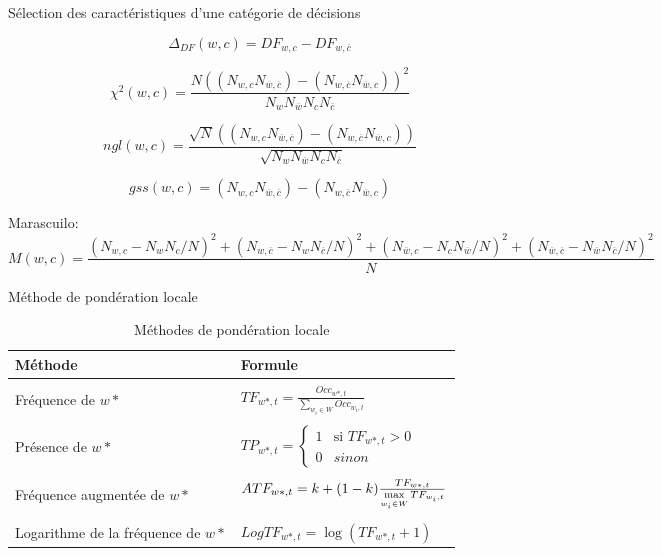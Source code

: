\documentclass[newPxFont,pagenumber]{beamer}
\renewcommand{\max}{\mathop{\mathrm{max}}\limits}
\begin{document}
\begin{frame}{Sélection des caractéristiques d'une catégorie de décisions}
\label{featuresSelectors}
\scriptsize 

\[\Delta_{DF}(w,c) = DF_{w,c} - DF_{w,\overline{c}}\]

\[\chi^2(w,c) = \frac{N ((N_{w,c} N_{\overline{w},\overline{c}}) - (N_{w,\overline{c}} N_{\overline{w},c}))^2}{N_w N_{\overline{w}} N_c N_{\overline{c}}}\]

\[ngl(w,c) = \frac{\sqrt{N} ((N_{w,c} N_{\overline{w},\overline{c}}) - (N_{w,\overline{c}} N_{\overline{w},c}))}{\sqrt{N_w N_{\overline{w}} N_c N_{\overline{c}}}}\]

\[gss(w,c) = (N_{w,c} N_{\overline{w},\overline{c}}) -  (N_{w,\overline{c}} N_{\overline{w},c})\]


Marascuilo:
\[M(w,c) = \frac{(N_{w,c} - N_{w}N_c/N)^2 + (N_{w,\overline{c}} - N_{w}N_{\overline{c}}/N)^2 + (N_{\overline{w},c} - N_{c}N_{\overline{w}}/N)^2 + (N_{\overline{w},\overline{c}} - N_{\overline{w}}N_{\overline{c}}/N)^2 }{N}\]

\end{frame}

\begin{frame}{Méthode de pondération locale}
\label{localWeights}
\scriptsize 

\begin{table}[!htb]
\centering
\begin{tabular}{|p{} p{}|}
\hline
\textbf{Méthode} & \textbf{Formule}  \\ \hline
 &  \\
Fréquence de $w*$  & $TF_{w*,t} = \frac{Occ_{w*,t}}{\sum\limits_{w_i \in W} Occ_{w_i,t}}$ \\ \hline
 &  \\ 
Présence de $w*$  & $TP_{w*,t} = \left\lbrace \begin{array}{cl}
1 & \text{si }TF_{w*,t} > 0 \\
0 & sinon
\end{array} \right.$ \\ \hline
 &  \\ 
Fréquence augmentée de $w*$ & $ATF_{w*,t} = k + (1-k) \frac{TF_{w*,t}}{\max\limits_{w_i \in W} TF_{w_i,t}}$  \\ \hline
 &  \\ 
Logarithme de la fréquence de $w*$ & $LogTF_{w*,t} = \log{(TF_{w*,t}+1)}$  \\ \hline
\end{tabular}
\caption{Méthodes de pondération locale} \label{PoidsLocal}
\end{table}
\end{frame}
\end{document}
